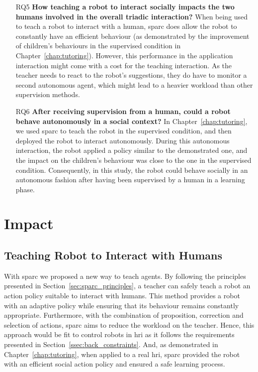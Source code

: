 \begin{itemize}
\item [RQ5] \textbf{How teaching a robot to interact socially impacts the two humans involved in the overall triadic interaction?}
When being used to teach a robot to interact with a human, \gls{sparc} does allow the robot to constantly have an efficient behaviour (as demonstrated by the improvement of children's behaviours in the supervised condition in Chapter~\ref{chap:tutoring}). However, this performance in the application interaction might come with a cost for the teaching interaction. As the teacher needs to react to the robot's suggestions, they do have to monitor a second autonomous agent, which might lead to a heavier workload than other supervision methods.

\item [RQ6] \textbf{After receiving supervision from a human, could a robot behave autonomously in a social context?}
In Chapter~\ref{chap:tutoring}, we used \gls{sparc} to teach the robot in the supervised condition, and then deployed the robot to interact autonomously. During this autonomous interaction, the robot applied a policy similar to the demonstrated one, and the impact on the children's behaviour was close to the one in the supervised condition. Consequently, in this study, the robot could behave socially in an autonomous fashion after having been supervised by a human in a learning phase.

\end{itemize}
\section{Impact} \label{sec:disc_impact}


\subsection{Teaching Robot to Interact with Humans}

With \gls{sparc} we proposed a new way to teach agents. By following the principles presented in Section~\ref{sec:sparc_principles}, a teacher can safely teach a robot an action policy suitable to interact with humans. This method provides a robot with an adaptive policy while ensuring that its behaviour remains constantly appropriate. Furthermore, with the combination of proposition, correction and selection of actions, \gls{sparc} aims to reduce the workload on the teacher. Hence, this approach would be fit to control robots in \gls{hri} as it follows the requirements presented in Section~\ref{ssec:back_constraints}. And, as demonstrated in Chapter~\ref{chap:tutoring}, when applied to a real \gls{hri}, \gls{sparc} provided the robot with an efficient social action policy and ensured a safe learning process. 

